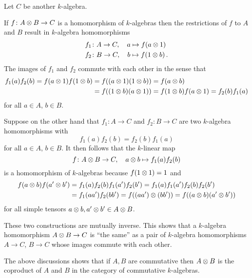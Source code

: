 \begin{fluff}
  \label{fluff: algebra homomorphisms out of tensor product}
  Let $C$ be another $k$-algebra.
  
  If $f \colon A \mathbin{\otimes} B \to C$ is a homomorphism of $k$-algebras then the restrictions of $f$ to $A$ and $B$ result in $k$-algebra homomorphisms
  \begin{align*}
              f_1
    &\colon   A
     \to      C,
     \quad    a
     \mapsto  f(a \mathbin{\otimes} 1)
  \\
              f_2
    &\colon   B
     \to      C,
     \quad    b
     \mapsto  f(1 \mathbin{\otimes} b) \,.
  \end{align*}
  The images of $f_1$ and $f_2$ commute with each other in the sense that
  \begin{align*}
        f_1(a) f_2(b)
     =  f(a \mathbin{\otimes} 1) f(1 \mathbin{\otimes} b)
    &=  f((a \mathbin{\otimes} 1)(1 \mathbin{\otimes} b))
     =  f(a \mathbin{\otimes} b)  \\
    &=  f((1 \mathbin{\otimes} b)(a \mathbin{\otimes} 1))
     =  f(1 \mathbin{\otimes} b) f(a \mathbin{\otimes} 1)
     =  f_2(b) f_1(a)
  \end{align*}
  for all $a \in A$, $b \in B$.
  
  Suppose on the other hand that $f_1 \colon A \to C$ and $f_2 \colon B \to C$ are two $k$-algebra homomorphisms with
  \[
      f_1(a) f_2(b)
    = f_2(b) f_1(a)
  \]
  for all $a \in A$, $b \in B$.
  It then follows that the $k$-linear map
  \[
            f
    \colon  A \mathbin{\otimes} B
    \to     C,
    \quad   a \mathbin{\otimes} b
    \mapsto f_1(a) f_2(b)
  \]
  is a homomorphism of $k$-algebras because $f(1 \mathbin{\otimes} 1) = 1$ and
  \begin{align*}
        f(a \mathbin{\otimes} b) f(a' \mathbin{\otimes} b')
    &=  f_1(a) f_2(b) f_1(a') f_2(b')
     =  f_1(a) f_1(a') f_2(b) f_2(b') \\
    &=  f_1(a a') f_2(b b')
     =  f((a a') \mathbin{\otimes} (b b'))
     =  f((a \mathbin{\otimes} b) (a' \mathbin{\otimes} b'))
  \end{align*}
  for all simple tensors $a \mathbin{\otimes} b, a' \mathbin{\otimes} b' \in A \mathbin{\otimes} B$.
  
  These two constructions are mutually inverse.
  This shows that a $k$-algebra homomorphism $A \mathbin{\otimes} B \to C$ is \enquote{the same} as a pair of $k$-algebra homomorphisms $A \to C$, $B \to C$ whose images commute with each other.
\end{fluff}


\begin{remark}
  The above discussions shows that if $A, B$ are commutative then $A \mathbin{\otimes} B$ is the coproduct of $A$ and $B$ in the category of commutative $k$-algebras.
\end{remark}


